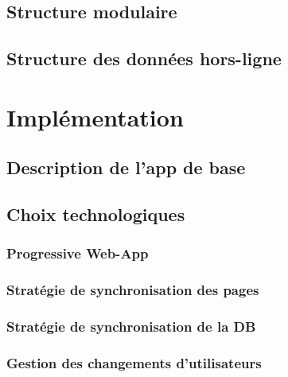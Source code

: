 \documentclass{EPL-master-thesis-covers-FR}
\begin{document}
		\section{Structure modulaire}
			\label{sec:modules}


			

		\section{Structure des données hors-ligne}
			\label{sec:data}


	\chapter{Implémentation}

		\section{Description de l'app de base}
		
		\section{Choix technologiques}
			\label{sec:choix_tech}
			
			\subsection*{Progressive Web-App}
				
			\subsection{Stratégie de synchronisation des pages}			
			
			\subsection{Stratégie de synchronisation de la DB}
			
			
			\subsection{Gestion des changements d'utilisateurs}		
			
\end{document}
